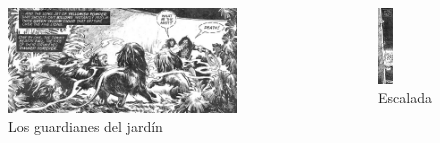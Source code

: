 \begin{frame}{}
\begin{columns}
    \begin{figure}[htb]
    \centering
        \includegraphics[width=0.85\textwidth]{img/res/09}
        \caption{Los guardianes del jardín}
    \end{figure}
    \begin{figure}[htb]
    \centering
        \includegraphics[width=0.28\textwidth]{img/res/10}
        \caption{Escalada}
    \end{figure}
\end{columns}
\end{frame}

